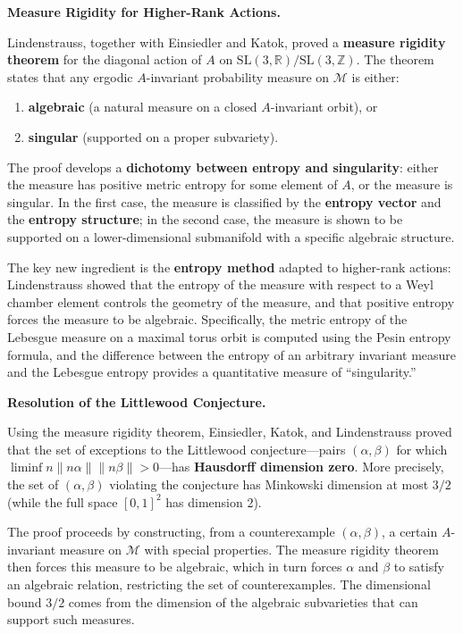 \textbf{Measure Rigidity for Higher-Rank Actions.}

Lindenstrauss, together with Einsiedler and Katok, proved a \textbf{measure rigidity theorem} for the diagonal action of $A$ on $\text{SL}(3,\mathbb{R})/\text{SL}(3,\mathbb{Z})$. The theorem states that any ergodic $A$-invariant probability measure on $\mathcal{M}$ is either:

\begin{enumerate}
  \item \textbf{algebraic} (a natural measure on a closed $A$-invariant orbit), or
  \item \textbf{singular} (supported on a proper subvariety).
\end{enumerate}

The proof develops a \textbf{dichotomy between entropy and singularity}: either the measure has positive metric entropy for some element of $A$, or the measure is singular. In the first case, the measure is classified by the \textbf{entropy vector} and the \textbf{entropy structure}; in the second case, the measure is shown to be supported on a lower-dimensional submanifold with a specific algebraic structure.

The key new ingredient is the \textbf{entropy method} adapted to higher-rank actions: Lindenstrauss showed that the entropy of the measure with respect to a Weyl chamber element controls the geometry of the measure, and that positive entropy forces the measure to be algebraic. Specifically, the metric entropy of the Lebesgue measure on a maximal torus orbit is computed using the Pesin entropy formula, and the difference between the entropy of an arbitrary invariant measure and the Lebesgue entropy provides a quantitative measure of ``singularity.''

\textbf{Resolution of the Littlewood Conjecture.}

Using the measure rigidity theorem, Einsiedler, Katok, and Lindenstrauss proved that the set of exceptions to the Littlewood conjecture---pairs $(\alpha,\beta)$ for which $\liminf n\|n\alpha\| \|n\beta\| > 0$---has \textbf{Hausdorff dimension zero}. More precisely, the set of $(\alpha,\beta)$ violating the conjecture has Minkowski dimension at most $3/2$ (while the full space $[0,1]^2$ has dimension 2).

The proof proceeds by constructing, from a counterexample $(\alpha,\beta)$, a certain $A$-invariant measure on $\mathcal{M}$ with special properties. The measure rigidity theorem then forces this measure to be algebraic, which in turn forces $\alpha$ and $\beta$ to satisfy an algebraic relation, restricting the set of counterexamples. The dimensional bound $3/2$ comes from the dimension of the algebraic subvarieties that can support such measures.


